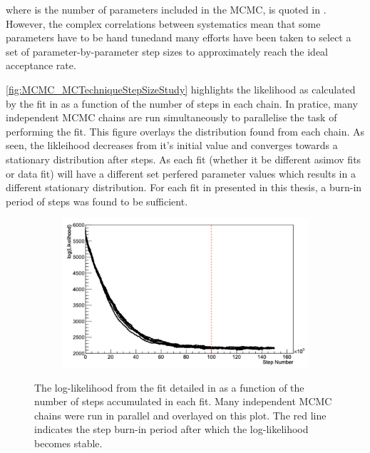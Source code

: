 where  is the number of parameters included in the MCMC, is quoted in \cite{Dunkley2005-xz}. However, the complex correlations between systematics mean that some parameters have to be hand tunedand many efforts have been taken to select a set of parameter-by-parameter step sizes to approximately reach the ideal acceptance rate.

\autoref{fig:MCMC_MCTechniqueStepSizeStudy} highlights the likelihood as calculated by the fit in  as a function of the number of steps in each chain. In pratice, many independent MCMC chains are run simultaneously to parallelise the task of performing the fit. This figure overlays the distribution found from each chain. As seen, the likleihood decreases from it's initial value and converges towards a stationary distribution after  steps. As each fit (whether it be different asimov fits or data fit) will have a different set perfered parameter values which results in a different stationary distribution. For each fit in presented in this thesis, a burn-in period of  steps was found to be sufficient.

\begin{figure}[h]
  \begin{subfigure}[t]{\textwidth}
    \includegraphics[width=\textwidth, trim={0mm 0mm 0mm 0mm}, clip,page=1]{Figures/MCMC/MCTechnique_LLHStep.pdf}
  \end{subfigure}
  \caption{The log-likelihood from the fit detailed in  as a function of the number of steps accumulated in each fit. Many independent MCMC chains were run in parallel and overlayed on this plot. The red line indicates the  step burn-in period after which the log-likelihood becomes stable.}
  \label{fig:MCMC_MCTechniqueLLHVsStep}
\end{figure}

